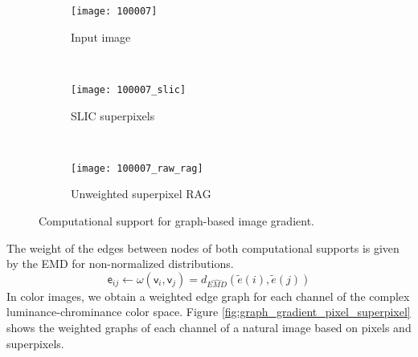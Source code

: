 \begin{figure}[!ht]
    \centering
    \begin{subfigure}[b]{0.3\textwidth}
    	\texttt{[image: 100007]} 
    	\caption{Input image}
    \end{subfigure}      
    ~ %
    \begin{subfigure}[b]{0.3\textwidth}
        \texttt{[image: 100007\_slic]}
        \caption{SLIC superpixels}
    \end{subfigure}
    ~ %
    \begin{subfigure}[b]{0.3\textwidth}
        \texttt{[image: 100007\_raw\_rag]}
        \caption{Unweighted superpixel RAG}
    \end{subfigure}
    
	\caption{Computational support for graph-based image gradient.}\label{fig:computational_support}    
\end{figure}

The weight of the edges between nodes of both computational supports is given by the EMD for non-normalized distributions. 
\begin{equation}
	\mathsf{e}_{ij} \leftarrow \omega(\mathsf{v}_i, \mathsf{v}_j) = d_{\widehat{EMD}}(\widetilde{e}(i), \widetilde{e}(j))
\end{equation}
In color images, we obtain a weighted edge graph for each channel of the complex luminance-chrominance color space. Figure \ref{fig:graph_gradient_pixel_superpixel} shows the weighted graphs of each channel of a natural image based on pixels and superpixels. 


